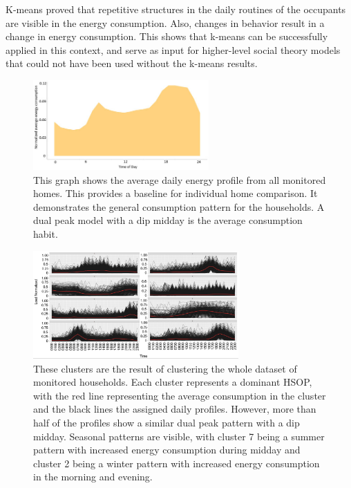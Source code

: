 K-means proved that repetitive structures in the daily routines of the occupants are visible in the energy consumption.
Also, changes in behavior result in a change in energy consumption.
This shows that k-means can be successfully applied in this context, and serve as input for higher-level social theory models that could not have been used without the k-means results.

\begin{figure}
    \centering
    \includegraphics[width=0.6\textwidth]{figures/malatesta_hsop/malatesta_totalDataAveraging.jpg}
    \caption{This graph shows the average daily energy profile from all monitored homes.
    This provides a baseline for individual home comparison.
    It demonstrates the general consumption pattern for the households.
    A dual peak model with a dip midday is the average consumption habit.
    }
    \label{fig:total_data_averaging}
\end{figure}

\begin{figure}
    \centering
    \includegraphics[width=0.7\textwidth]{figures/malatesta_hsop/malatesta_clusteringWholeDataset.png}
    \caption{These clusters are the result of clustering the whole dataset of monitored households.
    Each cluster represents a dominant HSOP, with the red line representing the average consumption in the cluster and the black lines the assigned daily profiles.
    However, more than half of the profiles show a similar dual peak pattern with a dip midday.
    Seasonal patterns are visible, with cluster 7 being a summer pattern with increased energy consumption during midday and cluster 2 being a winter pattern with increased energy consumption in the morning and evening.
    }
    \label{fig:clustering_whole_dataset}
\end{figure}

